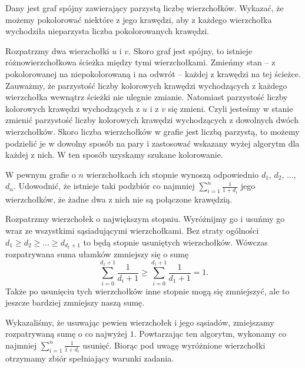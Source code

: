 \newpage

\begin{problem}{4}
	Dany jest graf spójny zawierający parzystą liczbę wierzchołków. Wykazać, że możemy pokolorować niektóre z jego krawędzi, aby z każdego wierzchołka wychodziła nieparzysta liczba pokolorowanych krawędzi.
\end{problem}

\noindent
Rozpatrzmy dwa wierzchołki $u$ i $v$. Skoro graf jest spójny, to istnieje różnowierzchołkowa ścieżka między tymi wierzchołkami. Zmieńmy stan -- z pokolorowanej na niepokolorowaną i na odwrót --  każdej z krawędzi na tej ścieżce. Zauważmy, że parzystość liczby kolorowych krawędzi wychodzących z każdego wierzchołka wewnątrz ścieżki nie ulegnie zmianie. Natomiast parzystość liczby kolorowych krawędzi wychodzących z $u$ i z $v$ się zmieni. Czyli jesteśmy w stanie zmienić parzystość liczby kolorowych krawędzi wychodzących z dowolnych dwóch wierzchołków. Skoro liczba wierzchołków w grafie jest liczbą parzystą, to możemy podzielić je w dowolny sposób na pary i zastosować wskazany wyżej algorytm dla każdej z nich. W ten sposób uzyskamy szukane kolorowanie.

\vspace{5px}

\begin{problem}{5}
	W pewnym grafie o $n$ wierzchołkach ich stopnie wynoszą odpowiednio $d_1$, $d_2$, ..., $d_n$. Udowodnić, że istnieje taki podzbiór co najmniej $\sum^{n}_{i = 1} \frac{1}{1 + d_i}$ jego wierzchołków, że żadne dwa z nich nie są połączone krawędzią.
\end{problem}

\noindent
Rozpatrzmy wierzchołek o największym stopniu. Wyróżnijmy go i usuńmy go wraz ze wszystkimi sąsiadującymi wierzchołkami. Bez straty ogólności $d_1 \geqslant d_2 \geqslant ... \geqslant d_{d_1 + 1}$ to będą stopnie usuniętych wierzchołków. Wówczas rozpatrywana suma ułamków zmniejszy się o sumę
\[
	\sum^{d_1 + 1}_{i = 0} \frac{1}{d_i + 1} \geqslant \sum^{d_1 + 1}_{i = 0} \frac{1}{d_1 + 1} = 1.
\]
Także po usunięciu tych wierzchołków inne stopnie mogą się zmniejszyć, ale to jeszcze bardziej zmniejszy naszą sumę.

Wykazaliśmy, że usuwając pewien wierzchołek i jego sąsiadów, zmiejszamy rozpatrywaną sumę o co najwyżej $1$. Powtarzając ten algorytm, wykonamy co najmniej $\sum^{n}_{i = 1} \frac{1}{1 + d_i}$ usunięć. Biorąc pod uwagę wyróżnione wierzchołki otrzymamy zbiór spełniający warunki zadania.

